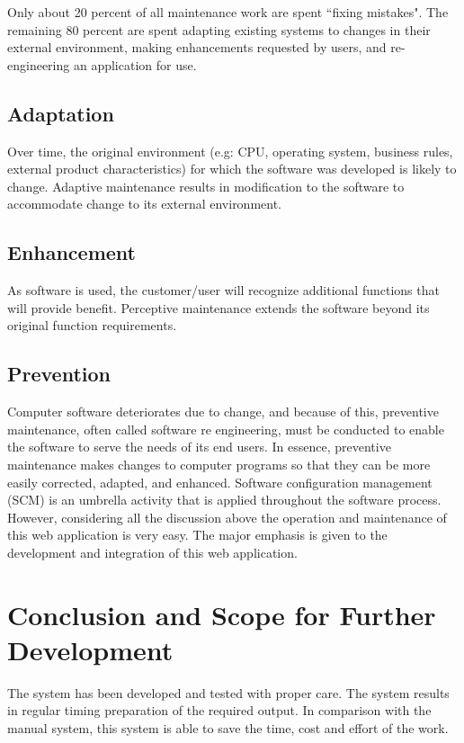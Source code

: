 \documentclass[12pt,a4 paper]{report}
\begin{document}
Only about 20 percent of all maintenance work are spent ``fixing mistakes". The remaining 80 percent are spent adapting existing systems to changes in their external environment, making enhancements requested by users, and re-engineering an application for use. \\

\section{Adaptation} 
Over time, the original environment (e.g: CPU, operating system, business rules, external product characteristics) for which the software was developed is likely to change. Adaptive maintenance results in modification to the software to accommodate change to its external environment.
 
\section{Enhancement}
As software is used, the customer/user will recognize additional functions that will provide benefit. Perceptive maintenance extends the software beyond its original function requirements. 

\section{Prevention}
Computer software deteriorates due to change, and because of this, preventive maintenance, often called software re engineering, must be conducted to enable the software to serve the needs of its end users. In essence, preventive maintenance makes changes to computer programs so that they can be more easily corrected, adapted, and enhanced.  Software 
configuration management (SCM) is an umbrella activity that is applied throughout the software process. \\

However, considering all the discussion above the operation and maintenance of this web application is very easy. The major emphasis is given to the development and integration of this web application.

\chapter{Conclusion and Scope for Further Development}
The system has been developed and tested with proper care. The system results in regular timing preparation of the required output. In  comparison with the manual system, this system is able to save the time, cost and effort of the work. \\
\end{document}
